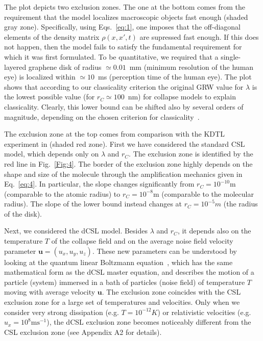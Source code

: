 \documentclass[prl,twocolumn,showpacs,superscriptaddress,groupedaddress]{revtex4}
\begin{document}
The plot depicts two exclusion zones. The one at the bottom comes from the requirement that the model localizes macroscopic objects fast enough (shaded gray zone). Specifically, using Eqs.~\eqref{eq:1}, one imposes that the off-diagonal elements of the density matrix $\rho(x,x',t)$ are supressed fast enough. If this does not happen, then the model fails to satisfy the fundamental requirement for which it was first formulated. To be quantitative, we required that a single-layered graphene disk of radius $\simeq 0.01$~mm (minimum resolution of the human eye) is localized within $\simeq 10$~ms (perception time of the human eye). The plot shows that according to our classicality criterion the original GRW value for $\lambda$ is  the lowest possible value (for $r_C \simeq 100$~nm) for collapse models to explain classicality. Clearly, this lower bound can be shifted also by several orders of magnitude, depending on the chosen criterion for classicality~\cite{1751-8121-45-6-065304}.

The exclusion zone at the top comes from comparison with the KDTL experiment in \cite{C3CP51500A} (shaded red  zone). First we have considered the standard CSL model, which depends only on $\lambda$ and $r_C$. The exclusion zone is identified by the red line in Fig.~\ref{Fig:4}. The border of the exclusion zone highly depends on the shape and size of the molecule through the amplification mechanics given in Eq.~\eqref{eq:4}. In particular, the slope changes significantly from $r_C=10^{-10}\text{m}$ (comparable to the atomic radius) to $r_C=10^{-8}\text{m}$ (comparable to the molecular radius). The slope of the lower bound instead changes at $r_C=10^{-5}m$ (the radius of the disk).

Next, we considered the dCSL model. Besides $\lambda$ and $r_C$, it depends also on the temperature $T$ of the collapse field and on the average noise field velocity parameter $\bm{u}=(u_x,u_y,u_z)$. These new parameters can be understood by looking at the quantum linear Boltzmann equation~\cite{Vacchini200971}, which has the same mathematical form as the dCSL master equation, and describes the motion of a particle (system) immersed in a bath of particles (noise field) of temperature $T$ moving with average velocity $\bm{u}$. The exclusion zone coincides with the CSL exclusion zone for a large set of temperatures and velocities. Only when we consider very strong dissipation (e.g. $T = 10^{-12}K$) or relativistic velocities (e.g. $u_x = 10^8\text{ms}^{-1}$), the dCSL exclusion zone becomes noticeably different from the CSL exclusion zone (see Appendix A2 for details). 
\end{document}
